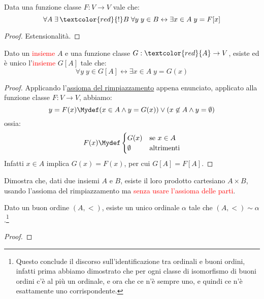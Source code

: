 \documentclass[11pt]{scrartcl}
\begin{document}
\begin{proposition}
	Data una funzione classe $F : V \rightarrow V$ vale che:
	\[ \forall A \; \exists\,\textcolor{red}{!} B \; \forall y \; y \in B \leftrightarrow \exists x \in A \; y = F[x]
		\]
\end{proposition}

\begin{proof}
	Estensionalità.
\end{proof}

\begin{remark}
	Dato un \textcolor{red}{insieme} $A$ e una funzione classe $G : \textcolor{red}{A} \rightarrow V$, esiste ed è unico l'\textcolor{red}{insieme} $G[A]$ tale che:
	\[ \forall y \; y \in G[A] \leftrightarrow \exists x \in A \; y = G(x)
		\]
\end{remark}

\begin{proof}
	Applicando l'\hyperref[ax8]{assioma del rimpiazzamento} appena enunciato, applicato alla funzione classe $F : V \rightarrow V$, abbiamo:
	\[ y = F(x) \Mydef (x \in A \land y = G(x)) \lor (x \not \in A \land y = \emptyset)
		\]
	ossia:
	\[ F(x) \Mydef \begin{cases}
		G(x) &\text{se $x \in A$} \\
		\emptyset &\text{altrimenti}
	\end{cases}
		\]
	Infatti $x \in A$ implica $G(x) = F(x)$, per cui $G[A] = F[A]$.
\end{proof}

\begin{exercise}
	Dimostra che, dati due insiemi $A$ e $B$, esiste il loro prodotto cartesiano $A \times B$, usando l'assioma del rimpiazzamento ma \textcolor{red}{senza usare l'assioma delle parti}.
\end{exercise}

\begin{theorem}
	Dato un buon ordine $(A,<)$, esiste un unico ordinale $\alpha$ tale che $(A,<)\sim\alpha$.\footnote{Questo conclude il discorso sull'identificazione tra ordinali e buoni ordini, infatti prima abbiamo dimostrato che per ogni classe 
	di isomorfismo di buoni ordini c'è al più un ordinale, e ora che ce n'è sempre uno, e quindi ce n'è esattamente uno corrispondente.}
\end{theorem}

\begin{proof}
	
\end{proof}
\end{document}

